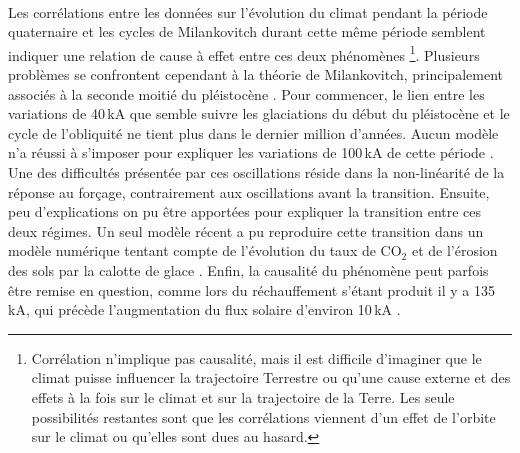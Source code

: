 





\paragraph{} Les corrélations entre les données sur l'évolution du climat pendant la période quaternaire et les cycles de Milankovitch durant cette même période semblent indiquer une relation de cause à effet entre ces deux phénomènes 
\footnote{Corrélation n'implique pas causalité, mais il est difficile d'imaginer que le climat puisse influencer la trajectoire Terrestre ou qu'une cause externe et des effets à la fois sur le climat et sur la trajectoire de la Terre. %
Les seule possibilités restantes sont que les corrélations viennent d'un effet de l'orbite sur le climat ou qu'elles sont dues au hasard.}.
Plusieurs problèmes se confrontent cependant à la théorie de Milankovitch, principalement associés à la seconde moitié du pléistocène \cite{wiki_milankovitch_cycles} \cite{huggett}. Pour commencer, le lien entre les variations de 40\,kA que semble suivre les glaciations du début du pléistocène et le cycle de l'obliquité ne tient plus dans le dernier million d'années. Aucun modèle n'a réussi à s'imposer pour expliquer les variations de 100\,kA de cette période \cite{wiki_100ky_problem}. Une des difficultés présentée par ces oscillations réside dans la non-linéarité de la réponse au forçage, contrairement aux oscillations avant la transition. Ensuite, peu d'explications on pu être apportées pour expliquer la transition entre ces deux régimes. Un seul modèle récent a pu reproduire cette transition dans un modèle numérique tentant compte de l'évolution du taux de CO$_2$ et de l'érosion des sols par la calotte de glace \cite{willeit2019}. Enfin, la causalité du phénomène peut parfois être remise en question, comme lors du réchauffement s'étant produit il y a 135\,kA, qui précède l'augmentation du flux solaire d'environ 10\,kA \cite{karner2000}.

